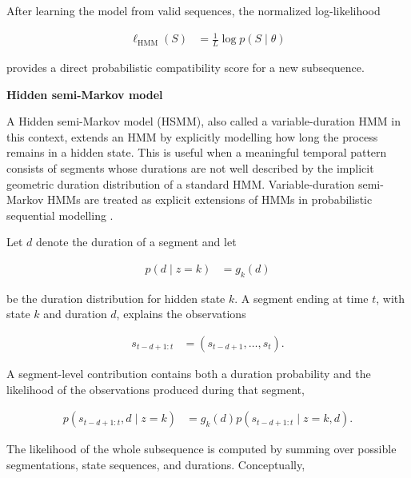 \documentclass{book}
\providecommand{\ProjectDeepHeading}[2]{%
    \par\medskip\noindent\textbf{#2}\par\smallskip
}
\begin{document}
        \noindent
        After learning the model from valid sequences, the normalized log-likelihood

        \begin{align}
            \ell_{\mathrm{HMM}}(S)
            &=
            \frac{1}{L}\log p(S\mid\ensuremath{\theta})
        \end{align}

        \noindent
        provides a direct probabilistic compatibility score for a new subsequence.

    \ProjectDeepHeading{3}{Hidden semi-Markov model}

        A Hidden semi-Markov model (HSMM), also called a variable-duration HMM in this context, extends an HMM by explicitly modelling how long the process remains in a hidden state. This is useful when a meaningful temporal pattern consists of segments whose durations are not well described by the implicit geometric duration distribution of a standard HMM. Variable-duration semi-Markov HMMs are treated as explicit extensions of HMMs in probabilistic sequential modelling \cite{murphy-2002-dynamic-bayesian-networks-representation-inference-and-learning}.

        Let \(d\) denote the duration of a segment and let

        \begin{align}
            p(d\mid z=k)
            &=
            g_k(d)
        \end{align}

        \noindent
        be the duration distribution for hidden state \(k\). A segment ending at time \(t\), with state \(k\) and duration \(d\), explains the observations

        \begin{align}
            s_{t-d+1:t}
            &=
            (s_{t-d+1},\dots,s_t).
        \end{align}

        \noindent
        A segment-level contribution contains both a duration probability and the likelihood of the observations produced during that segment,

        \begin{align}
            p(s_{t-d+1:t},d\mid z=k)
            &=
            g_k(d)
            p(s_{t-d+1:t}\mid z=k,d).
        \end{align}

        \noindent
        The likelihood of the whole subsequence is computed by summing over possible segmentations, state sequences, and durations. Conceptually,
\end{document}
